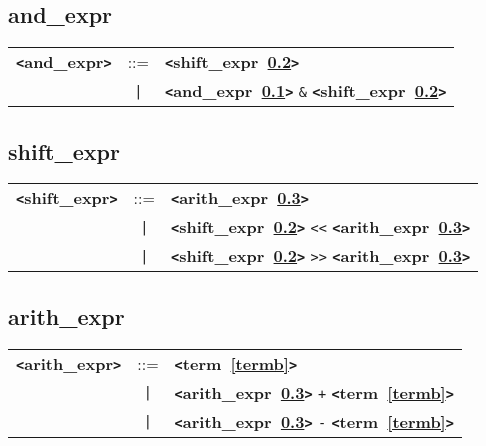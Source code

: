 \documentclass[12pt]{article}
\begin{document}
\subsection{and\_expr}
\label{andzzzexprb}
\begin{tabular}{lcl}
{\bf \verb+<+and\_expr\verb+>+} & ::=  & {\bf \verb+<+shift\_expr~\ref{shiftzzzexprb}\verb+>+}  \\
 & \verb+|+  & {\bf \verb+<+and\_expr~\ref{andzzzexprb}\verb+>+}  \verb|&| {\bf \verb+<+shift\_expr~\ref{shiftzzzexprb}\verb+>+}  \\
\end{tabular}

\subsection{shift\_expr}
\label{shiftzzzexprb}
\begin{tabular}{lcl}
{\bf \verb+<+shift\_expr\verb+>+} & ::=  & {\bf \verb+<+arith\_expr~\ref{arithzzzexprb}\verb+>+}  \\
 & \verb+|+  & {\bf \verb+<+shift\_expr~\ref{shiftzzzexprb}\verb+>+}  \verb|<<| {\bf \verb+<+arith\_expr~\ref{arithzzzexprb}\verb+>+}  \\
 & \verb+|+  & {\bf \verb+<+shift\_expr~\ref{shiftzzzexprb}\verb+>+}  \verb|>>| {\bf \verb+<+arith\_expr~\ref{arithzzzexprb}\verb+>+}  \\
\end{tabular}

\subsection{arith\_expr}
\label{arithzzzexprb}
\begin{tabular}{lcl}
{\bf \verb+<+arith\_expr\verb+>+} & ::=  & {\bf \verb+<+term~\ref{termb}\verb+>+}  \\
 & \verb+|+  & {\bf \verb+<+arith\_expr~\ref{arithzzzexprb}\verb+>+}  \verb|+| {\bf \verb+<+term~\ref{termb}\verb+>+}  \\
 & \verb+|+  & {\bf \verb+<+arith\_expr~\ref{arithzzzexprb}\verb+>+}  \verb|-| {\bf \verb+<+term~\ref{termb}\verb+>+}  \\
\end{tabular}
\end{document}
